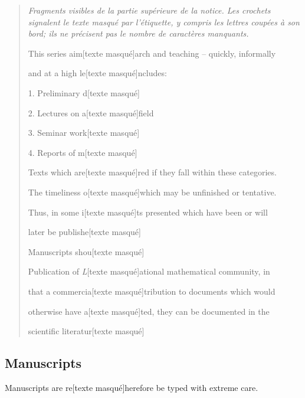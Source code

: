 \begin{quote}
\textit{Fragments visibles de la partie supérieure de la notice. Les crochets
signalent le texte masqué par l'étiquette, y compris les lettres coupées à son
bord; ils ne précisent pas le nombre de caractères manquants.}
\begin{flushleft}
This series aim[texte masqué]arch and teaching -- quickly, informally\par
and at a high le[texte masqué]ncludes:\par
1. Preliminary d[texte masqué]\par
2. Lectures on a[texte masqué]field\par
3. Seminar work[texte masqué]\par
4. Reports of m[texte masqué]\par
Texts which are[texte masqué]red if they fall within these categories.\par
The timeliness o[texte masqué]which may be unfinished or tentative.\par
Thus, in some i[texte masqué]ts presented which have been or will\par
later be publishe[texte masqué]\par
Manuscripts shou[texte masqué]\par
Publication of \textit{L}[texte masqué]ational mathematical community, in\par
that a commercia[texte masqué]tribution to documents which would\par
otherwise have a[texte masqué]ted, they can be documented in the\par
scientific literatur[texte masqué]
\end{flushleft}
\end{quote}

\subsection*{Manuscripts}
Manuscripts are re[texte masqué]herefore be typed with extreme care.
